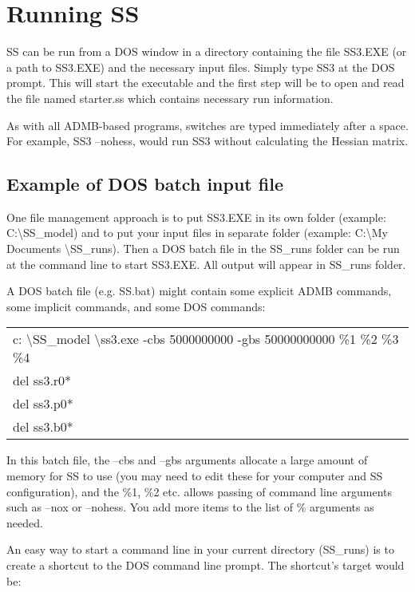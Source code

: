 \section{Running SS}
SS can be run from a DOS window in a directory containing the file SS3.EXE (or a path to SS3.EXE) and the necessary input files.  Simply type SS3 at the DOS prompt.  This will start the executable and the first step will be to open and read the file named starter.ss which contains necessary run information.

As with all ADMB-based programs, switches are typed immediately after a space.  For example, SS3 –nohess, would run SS3 without calculating the Hessian matrix.

\subsection{Example of DOS batch input file}
One file management approach is to put SS3.EXE in its own folder (example:  C:\textbackslash SS\_model) and to put your input files in separate folder (example:  C:\textbackslash My Documents \textbackslash SS\_runs).  Then a DOS batch file in the SS\_runs folder can be run at the command line to start SS3.EXE.  All output will appear in SS\_runs folder.

A DOS batch file (e.g. SS.bat) might contain some explicit ADMB commands, some implicit commands, and some DOS commands:

\begin{center}
	\begin{longtable}{ p{13cm} }
		c: \textbackslash SS\_model \textbackslash ss3.exe -cbs 5000000000 -gbs 50000000000 \%1 \%2 \%3 \%4 \\
		del ss3.r0*\\
		del ss3.p0*\\
		del ss3.b0*\\
	\end{longtable}
\end{center}

In this batch file, the –cbs and –gbs arguments allocate a large amount of memory for SS to use (you may need to edit these for your computer and SS configuration), and the \%1, \%2 etc. allows passing of command line arguments such as –nox or –nohess.  You add more items to the list of \% arguments as needed.

An easy way to start a command line in your current directory (SS\_runs) is to create a shortcut to the DOS command line prompt.  The shortcut’s target would be:

